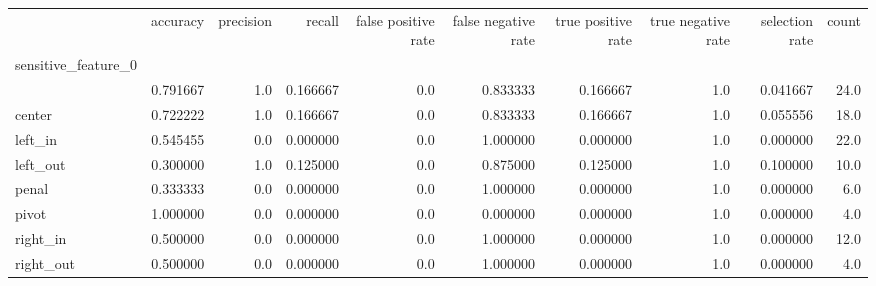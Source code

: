 \begin{tabular}{lrrrrrrrrr}
\toprule
{} &  accuracy &  precision &    recall &  false positive rate &  false negative rate &  true positive rate &  true negative rate &  selection rate &  count \\
sensitive\_feature\_0 &           &            &           &                      &                      &                     &                     &                 &        \\
\midrule
                    &  0.791667 &        1.0 &  0.166667 &                  0.0 &             0.833333 &            0.166667 &                 1.0 &        0.041667 &   24.0 \\
center              &  0.722222 &        1.0 &  0.166667 &                  0.0 &             0.833333 &            0.166667 &                 1.0 &        0.055556 &   18.0 \\
left\_in             &  0.545455 &        0.0 &  0.000000 &                  0.0 &             1.000000 &            0.000000 &                 1.0 &        0.000000 &   22.0 \\
left\_out            &  0.300000 &        1.0 &  0.125000 &                  0.0 &             0.875000 &            0.125000 &                 1.0 &        0.100000 &   10.0 \\
penal               &  0.333333 &        0.0 &  0.000000 &                  0.0 &             1.000000 &            0.000000 &                 1.0 &        0.000000 &    6.0 \\
pivot               &  1.000000 &        0.0 &  0.000000 &                  0.0 &             0.000000 &            0.000000 &                 1.0 &        0.000000 &    4.0 \\
right\_in            &  0.500000 &        0.0 &  0.000000 &                  0.0 &             1.000000 &            0.000000 &                 1.0 &        0.000000 &   12.0 \\
right\_out           &  0.500000 &        0.0 &  0.000000 &                  0.0 &             1.000000 &            0.000000 &                 1.0 &        0.000000 &    4.0 \\
\bottomrule
\end{tabular}
